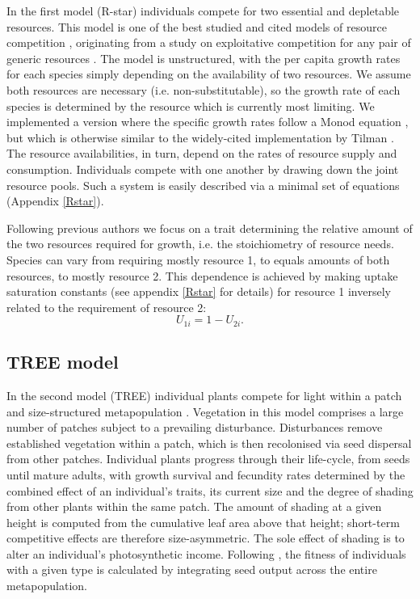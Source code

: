 \documentclass[a4paper,11pt]{article}
\begin{document}
In the first model (R-star) individuals compete for two essential and
depletable resources. This model is one of the best studied and cited models
of resource competition \citep{Tilman-1977, Tilman-1982, Huisman-1999},
originating from a study on exploitative competition for any pair of generic
resources \citep{Leon-1975}. The model is unstructured, with the per capita
growth rates for each species simply depending on the availability of two
resources. We assume both resources are necessary (i.e. non-substitutable), so
the growth rate of each species is determined by the resource which is
currently most limiting. We implemented a version where the specific growth
rates follow a Monod equation \citet{Huisman-1999}, but which is otherwise
similar to the widely-cited implementation by Tilman \citep{Tilman-1977,
Tilman-1982}.  The resource availabilities, in turn, depend on the rates of
resource supply and consumption. Individuals compete with one another by
drawing down the joint resource pools. Such a system is easily described via a
minimal set of equations (Appendix \ref{Rstar}).


Following previous authors \citep{Tilman-1985, Schreiber-2003, Fox-2008} we
focus on a trait determining the relative amount of the two resources
required for growth, i.e. the stoichiometry of resource needs. Species can
vary from requiring mostly resource 1, to equals amounts of both resources, to
mostly resource 2. This dependence is achieved by making uptake saturation
constants (see appendix  \ref{Rstar} for details) for resource 1 inversely related
to the requirement of resource 2:
\begin{equation}
\label{eq:R3}
U_{1i} = 1-U_{2i}.
\end{equation}

\subsection{TREE model}

In the second model (TREE) individual plants compete for light within a patch
and size-structured metapopulation \citep{Falster-2011, Falster-2015}.
Vegetation in this model comprises a large number of patches subject to a
prevailing disturbance. Disturbances remove established vegetation within a
patch, which is then recolonised via seed dispersal from other patches.
Individual plants progress through their life-cycle, from seeds until mature
adults, with growth survival and fecundity rates determined by the combined
effect of an individual's traits, its current size and the degree of shading
from other plants within the same patch. The amount of shading at a given
height is computed from the cumulative leaf area above that height; short-term
competitive effects are therefore size-asymmetric. The sole effect of shading
is to alter an individual's photosynthetic income. Following
\citep{Falster-2015}, the fitness of individuals with a given type is
calculated by integrating seed output across the entire metapopulation.
\end{document}
